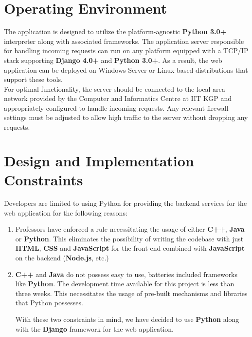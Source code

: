\documentclass{scrreprt}
\begin{document}
\section{Operating Environment}
The application is designed to utilize the platform-agnostic \textbf{Python 3.0+} interpreter along with associated frameworks. The application server responsible for handling incoming requests can run on any platform equipped with a TCP/IP stack supporting \textbf{Django 4.0+} and \textbf{Python 3.0+}. As a result, the web application can be deployed on Windows Server or Linux-based distributions that support these tools.\\
For optimal functionality, the server should be connected to the local area network provided by the Computer and Informatics Centre at IIT KGP and appropriately configured to handle incoming requests. Any relevant firewall settings must be adjusted to allow high traffic to the server without dropping any requests.

\section{Design and Implementation Constraints}
Developers are limited to using Python for providing the backend services for the web application for the following reasons:
\begin{enumerate}
    \item Professors have enforced a rule necessitating the usage of either \textbf{C++}, \textbf{Java} or \textbf{Python}. This eliminates the possibility of writing the codebase with just \textbf{HTML}, \textbf{CSS} and \textbf{JavaScript} for the front-end combined with \textbf{JavaScript} on the backend (\textbf{Node.js}, etc.)
    \item \textbf{C++} and \textbf{Java} do not possess easy to use, batteries included frameworks like \textbf{Python}. The development time available for this project is less than three weeks. This necessitates the usage of pre-built mechanisms and libraries that Python possesses.

With these two constraints in mind, we have decided to use \textbf{Python} along with the \textbf{Django} framework for the web application.
\end{enumerate}
\end{document}

